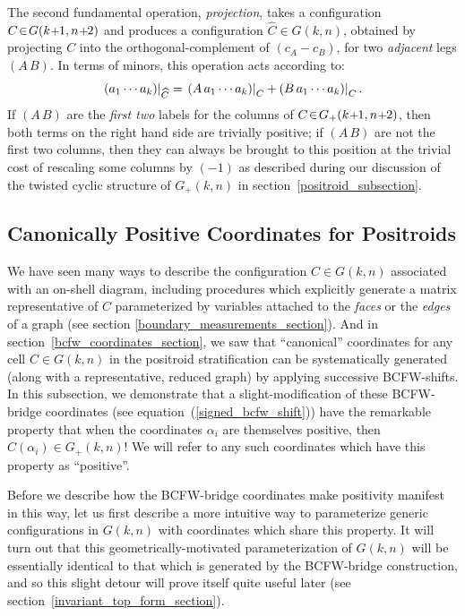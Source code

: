 \documentclass[12pt,hyperref,compress]{JHEP3}
\renewcommand{\hat}{\widehat}
\newcommand{\eq}[1]{\begin{equation}#1\end{equation}}
\newcommand{\pl}{\hspace{0.5pt}\text{{\small+}}\hspace{-0.5pt}}
\begin{document}
{The second fundamental operation, {\it projection}, takes a configuration $C\!\in\!G(k\pl1,n\pl2)$ and produces a configuration $\hat{C}\!\in\!G(k,n)$, obtained by projecting $C$ into the orthogonal-complement of $(c_A-c_B)$, for two {\it adjacent} legs $(A\,B)$. In terms of minors, this operation acts according to:
\vspace{-.2cm}\eq{\left.(a_1\cdots a_k)\right|_{\hat{C}}=\left.(A\,a_1\cdots a_k)\right|_{C}+\!\left.(B\,a_1\cdots a_k)\right|_{C}.\vspace{-.2cm}}
If $(A\,B)$ are the {\it first two} labels for the columns of $C\!\in\!G_+(k\pl1,n\pl2)$, then both terms on the right hand side are trivially positive; if $(A\,B)$ are not the first two columns, then they can always be brought to this position at the trivial cost of rescaling some columns by $(-1)$ as described during our discussion of the twisted cyclic structure of $G_+(k,n)$ in \mbox{section \ref{positroid_subsection}}.



\subsection{Canonically Positive Coordinates for Positroids}\label{polygon_coordinates_section}
We have seen many ways to describe the configuration $C\!\in\!G(k,n)$ associated with an on-shell diagram, including procedures which explicitly generate a matrix representative of $C$ parameterized by variables attached to the {\it faces} or the {\it edges} of a graph (see section \ref{boundary_measurements_section}).  And in \mbox{section \ref{bcfw_coordinates_section}}, we saw that ``canonical'' coordinates
for any cell $C\!\in\!G(k,n)$ in the positroid stratification can be systematically generated (along with a representative, reduced graph) by applying  successive BCFW-shifts. In this subsection, we demonstrate that a slight-modification of these BCFW-bridge coordinates (see \mbox{equation (\ref{signed_bcfw_shift}})) have the remarkable property that when the coordinates $\alpha_i$ are themselves positive, then $C(\alpha_i)\!\in\!G_+(k,n)$! We will refer to any such coordinates which have this property as ``positive''.

Before we describe how the BCFW-bridge coordinates make positivity manifest in this way, let us first describe a more intuitive way to parameterize generic configurations in $G(k,n)$ with coordinates which share this property. It will turn out that this geometrically-motivated parameterization of $G(k,n)$ will be essentially identical to that which is generated by the BCFW-bridge construction, and so this slight detour will prove itself quite useful later (see \mbox{section \ref{invariant_top_form_section}}).

}
\end{document}
